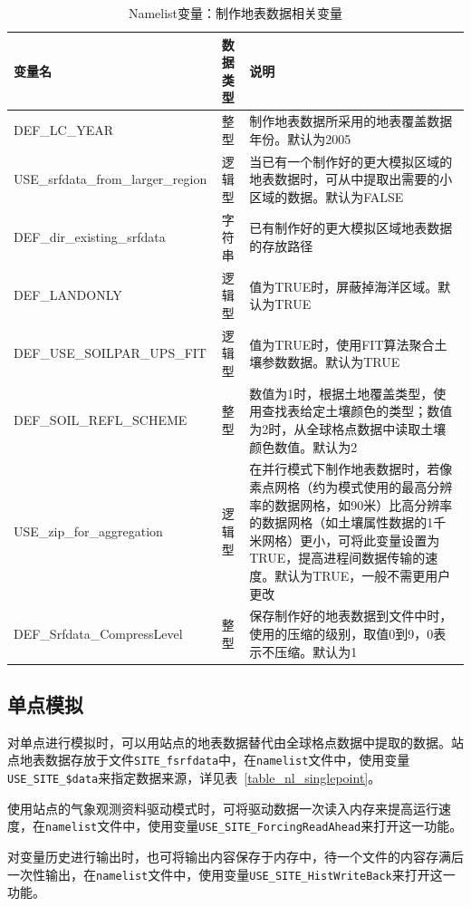 \documentclass[a4paper,12pt,twoside]{article}
\begin{document}
\begin{table}[!htbp] \small
\caption{Namelist变量：制作地表数据相关变量} \label{table_nl_mksrfdata}
\centering \renewcommand{\arraystretch}{1.2}
\begin{tabular}{lcp{}}
\toprule
\textbf{变量名} & \textbf{数据类型} & \textbf{说明} \\\midrule
DEF\_LC\_YEAR & 整型 & 制作地表数据所采用的地表覆盖数据年份。默认为2005\\
USE\_srfdata\_from\_larger\_region & 逻辑型 & 当已有一个制作好的更大模拟区域的地表数据时，可从中提取出需要的小区域的数据。默认为FALSE \\
DEF\_dir\_existing\_srfdata & 字符串 & 已有制作好的更大模拟区域地表数据的存放路径 \\
DEF\_LANDONLY & 逻辑型 & 值为TRUE时，屏蔽掉海洋区域。默认为TRUE \\
DEF\_USE\_SOILPAR\_UPS\_FIT & 逻辑型 & 值为TRUE时，使用FIT算法聚合土壤参数数据。默认为TRUE \\
DEF\_SOIL\_REFL\_SCHEME & 整型 & 数值为1时，根据土地覆盖类型，使用查找表给定土壤颜色的类型；数值为2时，从全球格点数据中读取土壤颜色数值。默认为2\\ 
USE\_zip\_for\_aggregation & 逻辑型 & 在并行模式下制作地表数据时，若像素点网格（约为模式使用的最高分辨率的数据网格，如90米）比高分辨率的数据网格（如土壤属性数据的1千米网格）更小，可将此变量设置为TRUE，提高进程间数据传输的速度。默认为TRUE，一般不需更用户更改 \\
DEF\_Srfdata\_CompressLevel & 整型 & 保存制作好的地表数据到文件中时，使用的压缩的级别，取值0到9，0表示不压缩。默认为1\\
\bottomrule
\end{tabular} 
\end{table}



\subsection{单点模拟}

对单点进行模拟时，可以用站点的地表数据替代由全球格点数据中提取的数据。站点地表数据存放于文件\texttt{SITE\_fsrfdata}中，在\texttt{namelist}文件中，使用变量\texttt{USE\_SITE\_\allowbreak\$data}来指定数据来源，详见表~\ref{table_nl_singlepoint}。

使用站点的气象观测资料驱动模式时，可将驱动数据一次读入内存来提高运行速度，在\texttt{namelist}文件中，使用变量\texttt{USE\_SITE\_ForcingReadAhead}来打开这一功能。

对变量历史进行输出时，也可将输出内容保存于内存中，待一个文件的内容存满后一次性输出，在\texttt{namelist}文件中，使用变量\texttt{USE\_SITE\_HistWriteBack}来打开这一功能。
\end{document}
